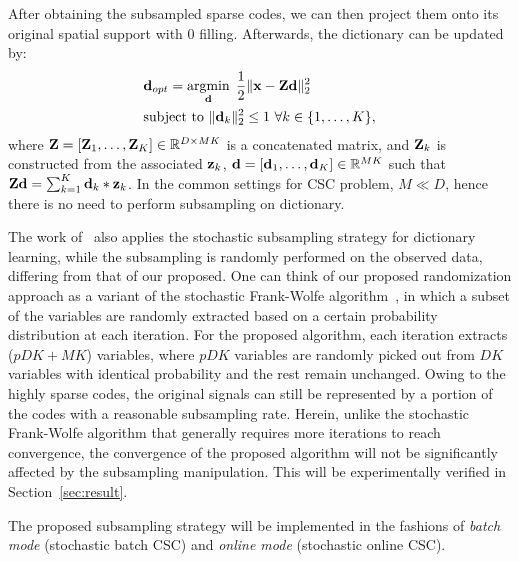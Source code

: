 After obtaining the subsampled sparse codes, we can then project them onto its original spatial support with $0$ filling. Afterwards, the dictionary can be updated by:
\begin{equation} \label{eq:updatingFilter}
\begin{split}
   & \filter_{opt} = \minimize{\filter} \frac{1}{2}\|\signal - \Code \filter \|_2^2 \\
   & \text{subject to}  ~ \|\filter_k\|^2_2 \leq 1 ~ \forall k \in \{1,\dots,K\},
\end{split}
\end{equation}
where $\Code= [\Code_1, \dots, \Code_K] \in \mathbb{R}^{D \times MK}$ is a concatenated matrix, and $\Code_k$ is constructed from the associated $\code_k$, $\filter= [\filter_1,\dots,\filter_K] \in \mathbb{R}^{MK}$ such that $ \Code \filter = \sum_{k=1}^{K} \filter_k * \code_k$. In the common settings for CSC problem, $M \ll D$, hence there is no need to perform subsampling on dictionary.

The work of~\cite{mensch2016dictionary} also applies the stochastic subsampling strategy for dictionary learning, while the subsampling is randomly performed on the observed data, differing from that of our proposed. One can think of our proposed randomization approach as a variant of the stochastic Frank-Wolfe algorithm~\cite{reddi2016stochastic,pmlr-v80-kerdreux18a}, in which a subset of the variables are randomly extracted based on a certain probability distribution at each iteration. For the proposed algorithm, each iteration extracts ($pDK+MK$) variables, where $pDK$ variables are randomly picked out from $DK$ variables with identical probability and the rest remain unchanged. Owing to the highly sparse codes, the original signals can still be represented by a portion of the codes with a reasonable subsampling rate. Herein, unlike the stochastic Frank-Wolfe algorithm that generally requires more iterations to reach convergence, the convergence of the proposed algorithm will not be significantly affected by the subsampling manipulation. This will be experimentally verified in Section~\ref{sec:result}.

The proposed subsampling strategy will be implemented in the fashions of {\em batch mode} (stochastic batch CSC) and {\em online mode} (stochastic online CSC).

